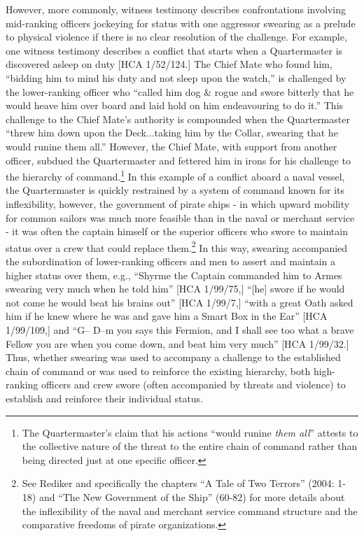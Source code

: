 However, more commonly, witness testimony describes confrontations involving mid-ranking officers jockeying for status with one aggressor swearing as a prelude to physical violence if there is no clear resolution of the challenge. For example, one witness testimony describes a conflict that starts when a Quartermaster is discovered asleep on duty [HCA 1/52/124.] The Chief Mate who found him, “bidding him to mind his duty and not sleep upon the watch,” is challenged by the lower-ranking officer who “called him dog \& rogue and swore bitterly that he would heave him over board and laid hold on him endeavouring to do it.” This challenge to the Chief Mate’s authority is compounded when the Quartermaster “threw him down upon the Deck...taking him by the Collar, swearing that he would runine them all.” However, the Chief Mate, with support from another officer, subdued the Quartermaster and fettered him in irons for his challenge to the hierarchy of command.\footnote{The Quartermaster’s claim that his actions “would runine \textit{them all}” attests to the collective nature of the threat to the entire chain of command rather than being directed just at one specific officer.}  In this example of a conflict aboard a naval vessel, the Quartermaster is quickly restrained by a system of command known for its inflexibility, however, the government of pirate ships - in which upward mobility for common sailors was much more feasible than in the naval or merchant service - it was often the captain himself or the superior officers who swore to maintain status over a crew that could replace them.\footnote{See Rediker and specifically the chapters “A Tale of Two Terrors” (2004: 1-18) and “The New Government of the Ship” (60-82) for more details about the inflexibility of the naval and merchant service command structure and the comparative freedoms of pirate organizations.}  In this way, swearing accompanied the subordination of lower-ranking officers and men to assert and maintain a higher status over them, e.g., “Shyrme the Captain commanded him to Armes swearing very much when he told him” [HCA 1/99/75,] “[he] swore if he would not come he would beat his brains out” [HCA 1/99/7,] “with a great Oath asked him if he knew where he was and gave him a Smart Box in the Ear” [HCA 1/99/109,] and “G-- D--m you says this Fermion, and I shall see too what a brave Fellow you are when you come down, and beat him very much” [HCA 1/99/32.] Thus, whether swearing was used to accompany a challenge to the established chain of command or was used to reinforce the {existing} {hierarchy, both high-ranking officers and crew swore (often accompanied by threats and violence) to} establish and reinforce their individual status.


